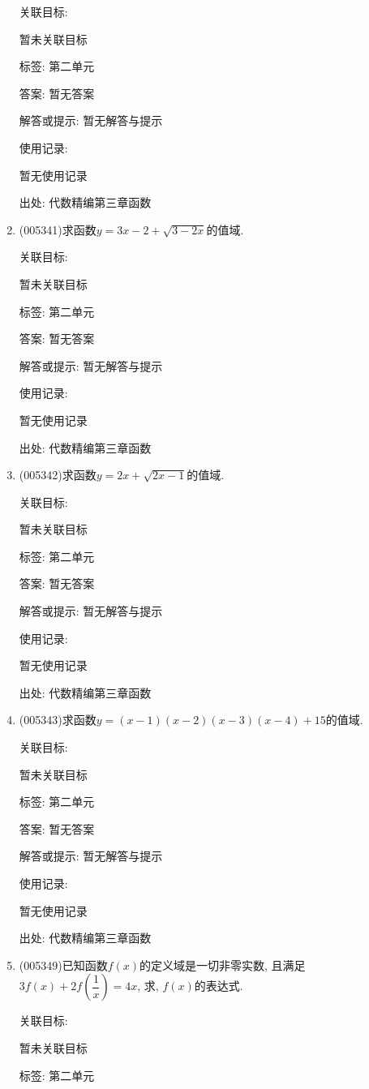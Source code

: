 \documentclass[10pt,a4paper]{article}
\begin{document}
\begin{enumerate}[1.]
关联目标:

暂未关联目标



标签: 第二单元

答案: 暂无答案

解答或提示: 暂无解答与提示

使用记录:

暂无使用记录


出处: 代数精编第三章函数
\item { (005341)}求函数$y=3x-2+\sqrt {3-2x}$的值域.


关联目标:

暂未关联目标



标签: 第二单元

答案: 暂无答案

解答或提示: 暂无解答与提示

使用记录:

暂无使用记录


出处: 代数精编第三章函数
\item { (005342)}求函数$y=2x+\sqrt {2x-1}$的值域.


关联目标:

暂未关联目标



标签: 第二单元

答案: 暂无答案

解答或提示: 暂无解答与提示

使用记录:

暂无使用记录


出处: 代数精编第三章函数
\item { (005343)}求函数$y=(x-1)(x-2)(x-3)(x-4)+15$的值域.


关联目标:

暂未关联目标



标签: 第二单元

答案: 暂无答案

解答或提示: 暂无解答与提示

使用记录:

暂无使用记录


出处: 代数精编第三章函数
\item { (005349)}已知函数$f(x)$的定义域是一切非零实数, 且满足$3f(x)+2f(\dfrac 1x)=4x$, 求, $f(x)$的表达式.


关联目标:

暂未关联目标



标签: 第二单元


\end{enumerate}
\end{document}
